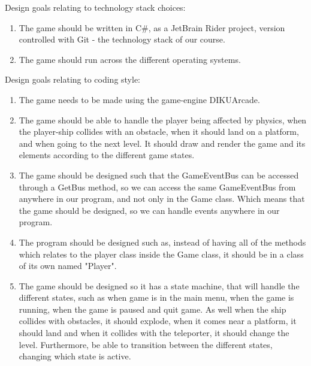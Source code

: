 \documentclass[../master.tex]{subfiles}
\begin{document}
Design goals relating to technology stack choices:
\begin{enumerate}
	\item The game should be written in C\#, as a JetBrain Rider project, version controlled with Git - the technology stack of our course.
	\item The game should run across the different operating systems. 
\end{enumerate}

Design goals relating to coding style:
\begin{enumerate}
	\item The game needs to be made using the game-engine DIKUArcade.
	\item The game should be able to handle the player being affected by physics, when the player-ship collides with an obstacle, when it should land on a platform, and when going to the next level. It should draw and render the game and its elements according to the different game states. 
	\item The game should be designed such that the GameEventBus can be accessed through a GetBus method, so we can access the same GameEventBus from anywhere in our program, and not only in the Game class. Which means that the game should be designed, so we can handle events anywhere in our program.
	\item The program should be designed such as, instead of having all of the methods which relates to the player class inside the Game class, it should be in a class of its own named "Player".
	\item The game should be designed so it has a state machine, that will handle the different states, such as when game is in the main menu, when the game is running, when the game is paused and quit game. As well when the ship collides with obstacles, it should explode, when it comes near a platform, it should land and when it collides with the teleporter, it should change the level. Furthermore, be able to transition between the different states, changing which state is active.
\end{enumerate}
\end{document}

